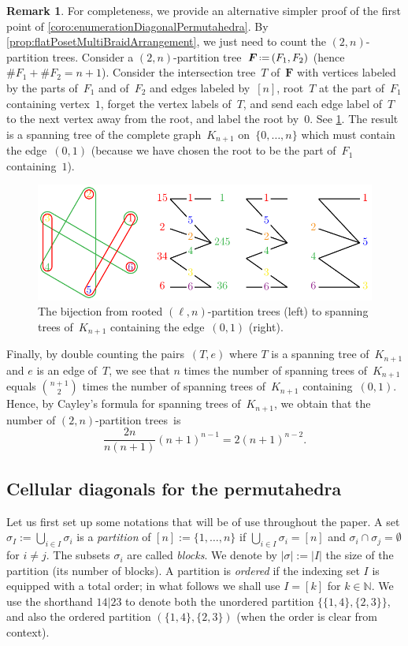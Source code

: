 \documentclass{amsart}
\theoremstyle{definition}
\newtheorem{remark}[theorem]{Remark}
\newcommand{\N}{\mathbb{N}} %
\renewcommand{\b}[1]{{\boldsymbol{#1}}} %
\newcommand{\eqdef}{\mbox{\,\raisebox{0.2ex}{\scriptsize\ensuremath{\mathrm:}}\ensuremath{=}\,}} %
\renewcommand{\b}[1]{\boldsymbol{#1}} %
\begin{document}
\begin{remark}
For completeness, we provide an alternative simpler proof of the first point of \cref{coro:enumerationDiagonalPermutahedra}.
By \cref{prop:flatPosetMultiBraidArrangement}, we just need to count the $(2,n)$-partition trees.
Consider a $(2,n)$-partition tree~$\b{F} \eqdef (F_1,F_2)$ (hence~$\# F_1 + \# F_2 = n + 1$).
Consider the intersection tree~$T$ of~$\b{F}$ with vertices labeled by the parts of~$F_1$ and of~$F_2$ and edges labeled by~$[n]$, root~$T$ at the part of~$F_1$ containing vertex~$1$, forget the vertex labels of~$T$, and send each edge label of~$T$ to the next vertex away from the root, and label the root by~$0$.
See \cref{fig:tree}.
The result is a spanning tree of the complete graph~$K_{n+1}$ on~$\{0, \dots, n\}$ which must contain the edge~$(0,1)$ (because we have chosen the root to be the part of~$F_1$ containing~$1$).
%
\begin{figure}
	\centerline{\includegraphics[scale=1]{tree}}
	\caption{The bijection from rooted $(\ell,n)$-partition trees (left) to spanning trees of~$K_{n+1}$ containing the edge~$(0,1)$ (right).}
	\label{fig:tree}
\end{figure}
%
Finally, by double counting the pairs~$(T,e)$ where $T$ is a spanning tree of~$K_{n+1}$ and $e$ is an edge of~$T$, we see that $n$ times the number of spanning trees of~$K_{n+1}$ equals $\binom{n+1}{2}$ times the number of spanning trees of~$K_{n+1}$ containing~$(0,1)$.
Hence, by Cayley's formula for spanning trees of~$K_{n+1}$, we obtain that the number of $(2,n)$-partition trees~is
\[
\frac{2n}{n(n+1)} (n+1)^{n-1} = 2 (n + 1)^{n-2}.
\]
\end{remark}


\subsection{Cellular diagonals for the permutahedra}
\label{s:diagonals-permutahedra}

Let us first set up some notations that will be of use throughout the paper. 
A set $\sigma_I := \bigcup_{i\in I} \sigma_i$ is a \emph{partition} of $[n]:=\{1,\ldots,n\}$ if $\bigcup_{i\in I} \sigma_i = [n]$ and $\sigma_i \cap \sigma_j = \emptyset$ for $i \neq j$.
The subsets $\sigma_i$ are called \emph{blocks}. 
We denote by $|\sigma|:=|I|$ the size of the partition (its number of blocks).
A partition is \emph{ordered} if the indexing set $I$ is equipped with a total order; in what follows we shall use $I=[k]$ for $k \in \N$. 
We use the shorthand $14|23$ to denote both the unordered  partition $\{\{1,4\},\{2,3\}\}$, and also the ordered partition $(\{1,4\},\{2,3\})$ (when the order is clear from context).
\end{document}
